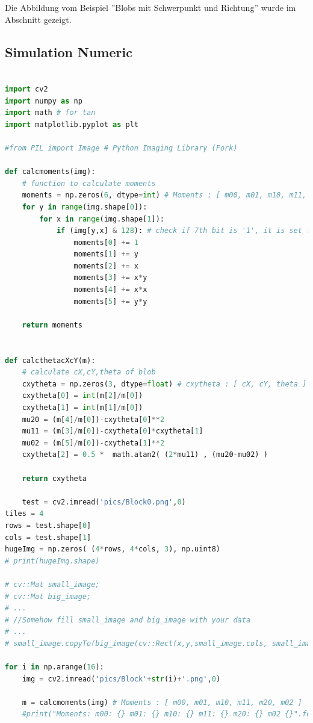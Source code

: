 \documentclass[a4paper]{report}
\begin{document}
Die Abbildung vom Beispiel ''Blobs mit Schwerpunkt und Richtung'' wurde im  Abschnitt \textbf{ } gezeigt.


\subsection{Simulation Numeric}

\begin{lstlisting}[language=Python, caption=Simulation Numeric]

import cv2
import numpy as np 
import math # for tan
import matplotlib.pyplot as plt

#from PIL import Image # Python Imaging Library (Fork)

def calcmoments(img):
    # function to calculate moments
    moments = np.zeros(6, dtype=int) # Moments : [ m00, m01, m10, m11, m20, m02 ]
    for y in range(img.shape[0]):
        for x in range(img.shape[1]):
            if (img[y,x] & 128): # check if 7th bit is '1', it is set for all gray values >=128
                moments[0] += 1
                moments[1] += y
                moments[2] += x
                moments[3] += x*y
                moments[4] += x*x
                moments[5] += y*y
    
    return moments
    
    
def calcthetacXcY(m):
    # calculate cX,cY,theta of blob
    cxytheta = np.zeros(3, dtype=float) # cxytheta : [ cX, cY, theta ]
    cxytheta[0] = int(m[2]/m[0])
    cxytheta[1] = int(m[1]/m[0])
    mu20 = (m[4]/m[0])-cxytheta[0]**2
    mu11 = (m[3]/m[0])-cxytheta[0]*cxytheta[1]
    mu02 = (m[5]/m[0])-cxytheta[1]**2
    cxytheta[2] = 0.5 *  math.atan2( (2*mu11) , (mu20-mu02) )
    
    return cxytheta
    
    test = cv2.imread('pics/Block0.png',0)
tiles = 4
rows = test.shape[0]
cols = test.shape[1]
hugeImg = np.zeros( (4*rows, 4*cols, 3), np.uint8)
# print(hugeImg.shape)

# cv::Mat small_image;
# cv::Mat big_image;
# ...
# //Somehow fill small_image and big_image with your data
# ...
# small_image.copyTo(big_image(cv::Rect(x,y,small_image.cols, small_image.rows)));

for i in np.arange(16):
    img = cv2.imread('pics/Block'+str(i)+'.png',0)
    
    m = calcmoments(img) # Moments : [ m00, m01, m10, m11, m20, m02 ]
    #print("Moments: m00: {} m01: {} m10: {} m11: {} m20: {} m02 {}".format(m[0],m[1],m[2],m[3],m[4],m[5]))
    

\end{lstlisting}
\end{document}
